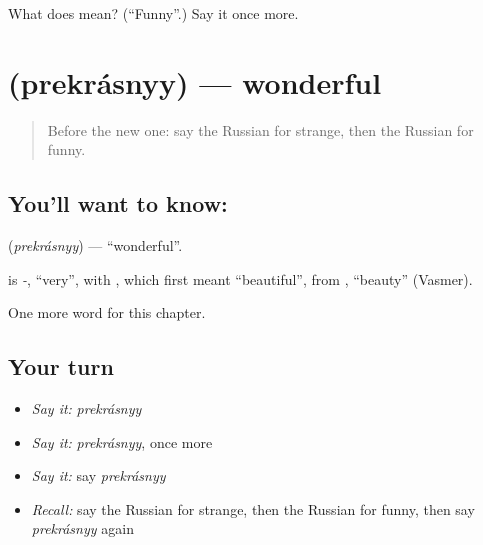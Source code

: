 \begin{tcolorbox}[breakable,colback=teal!4,colframe=teal!35!black,title={Before you move on}]
What does  mean? (\textquotedblleft{}Funny\textquotedblright{}.) Say it once more.
\end{tcolorbox}
\section[\texorpdfstring{\ru{прекрасный} (prekrásnyy)}{прекрасный (prekrásnyy)}]{ (prekrásnyy) — wonderful}

\label{lesson:RU-C245-prekrasnyy}



\begin{quote}
Before the new one: say the Russian for strange, then the Russian for funny.
\end{quote}

\subsection*{You'll want to know: }
\textbf{} (\emph{prekrásnyy}) — \textquotedblleft{}wonderful\textquotedblright{}.

\begin{cousinweb}
\textbf{} is \emph{-}, \textquotedblleft{}very\textquotedblright{}, with \emph{}, which first meant \textquotedblleft{}beautiful\textquotedblright{}, from \emph{}, \textquotedblleft{}beauty\textquotedblright{} (Vasmer).
\end{cousinweb}

\begin{grammarlens}[title={What you've built}]
One more word for this chapter.
\end{grammarlens}

\subsection*{Your turn}
\begin{itemize}
\raggedright
  \item \emph{Say it:} \emph{prekrásnyy}
  \item \emph{Say it:} \emph{prekrásnyy}, once more
  \item \emph{Say it:} say \emph{prekrásnyy}
  \item \emph{Recall:} say the Russian for strange, then the Russian for funny, then say \emph{prekrásnyy} again
\end{itemize}

